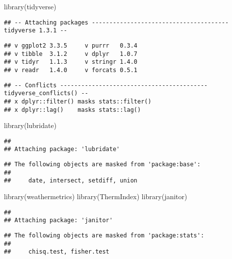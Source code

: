 \documentclass[
]{article}
\author{}
\date{\vspace{-2.5em}}
\newenvironment{Shaded}{\begin{snugshade}}{\end{snugshade}}
\newcommand{\FunctionTok}[1]{\textcolor[rgb]{0.00,0.00,0.00}{#1}}
\newcommand{\NormalTok}[1]{#1}
\begin{document}
\begin{Shaded}
\begin{Highlighting}[]
\FunctionTok{library}\NormalTok{(tidyverse)}
\end{Highlighting}
\end{Shaded}

\begin{verbatim}
## -- Attaching packages --------------------------------------- tidyverse 1.3.1 --
\end{verbatim}

\begin{verbatim}
## v ggplot2 3.3.5     v purrr   0.3.4
## v tibble  3.1.2     v dplyr   1.0.7
## v tidyr   1.1.3     v stringr 1.4.0
## v readr   1.4.0     v forcats 0.5.1
\end{verbatim}

\begin{verbatim}
## -- Conflicts ------------------------------------------ tidyverse_conflicts() --
## x dplyr::filter() masks stats::filter()
## x dplyr::lag()    masks stats::lag()
\end{verbatim}

\begin{Shaded}
\begin{Highlighting}[]
\FunctionTok{library}\NormalTok{(lubridate)}
\end{Highlighting}
\end{Shaded}

\begin{verbatim}
## 
## Attaching package: 'lubridate'
\end{verbatim}

\begin{verbatim}
## The following objects are masked from 'package:base':
## 
##     date, intersect, setdiff, union
\end{verbatim}

\begin{Shaded}
\begin{Highlighting}[]
\FunctionTok{library}\NormalTok{(weathermetrics)}
\FunctionTok{library}\NormalTok{(ThermIndex)}
\FunctionTok{library}\NormalTok{(janitor)}
\end{Highlighting}
\end{Shaded}

\begin{verbatim}
## 
## Attaching package: 'janitor'
\end{verbatim}

\begin{verbatim}
## The following objects are masked from 'package:stats':
## 
##     chisq.test, fisher.test
\end{verbatim}
\end{document}
